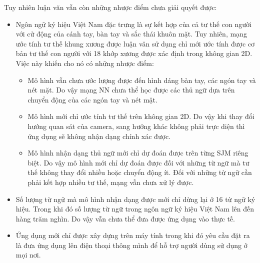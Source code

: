 Tuy nhiên luận văn vẫn còn những nhược điểm chưa giải quyết được:
	\begin{itemize}
	\item Ngôn ngữ ký hiệu Việt Nam đặc trưng là sự kết hợp của cả tư thế con người với cử động của cánh tay, bàn tay và sắc thái khuôn mặt. Tuy nhiên, mạng ước tính tư thế khung xương được luận văn sử dụng chỉ mới ước tính được cơ bản tư thế con người với 18 khớp xương được xác định trong không gian 2D. Việc này khiến cho nó có những nhược điểm: 
\begin{itemize}
	\item Mô hình vẫn chưa ước lượng được đến hình dáng bàn tay, các ngón tay và nét mặt. Do vậy mạng NN chưa thể học được các thủ ngữ dựa trên chuyển động của các ngón tay và nét mặt.
	\item Mô hình mới chỉ ước tính tư thế trên không gian 2D. Do vậy khi thay đổi hướng quan sát của camera, sang hướng khác không phải trực diện thì ứng dụng sẽ không nhận dạng chính xác được.
	\item Mô hình nhận dạng thủ ngữ mới chỉ dự đoán được trên từng SJM riêng biệt. Do vậy mô hình mới chỉ dự đoán được đối với những từ ngữ mà tư thế không thay đổi nhiều hoặc chuyển động ít. Đối với những từ ngữ cần phải kết hợp nhiều tư thế, mạng vẫn chưa xử lý được.
	\end{itemize}
\item Số lượng từ ngữ mà mô hình nhận dạng được mới chỉ dừng lại ở 16 từ ngữ ký hiệu. Trong khi đó số lượng từ ngữ trong ngôn ngữ ký hiệu Việt Nam lên đến hàng trăm nghìn. Do vậy vẫn chưa thể đưa được ứng dụng vào thực tế.

\item Ứng dụng mới chỉ được xây dựng trên máy tính trong khi đó yêu cầu đặt ra là đưa ứng dụng lên điện thoại thông mình để hỗ trợ người dùng sử dụng ở mọi nơi.
\end{itemize}
